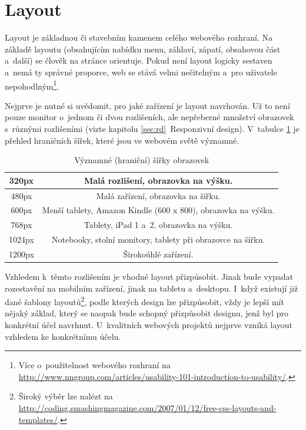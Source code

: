 \documentclass[thesis=B,czech]{FITthesis}[2012/06/26]
\begin{document}
\section{Layout}



Layout je základnou či stavebním kamenem celého webového rozhraní. Na základě layoutu (obsahujícím nabídku menu, záhlaví, zápatí, obsahovou část a~další) se člověk na stránce orientuje. Pokud není layout logicky sestaven a~nemá ty správné proporce, web se stává velmi nečitelným a~pro uživatele nepohodlným\footnote{Více o~použitelnost webového rozhraní na \url{http://www.nngroup.com/articles/usability-101-introduction-to-usability/}.}.

Nejprve je nutné si uvědomit, pro jaké zařízení je layout navrhován. Už to není pouze monitor o~jednom či dvou rozlišeních, ale nepřeberné množství obrazovek s~různými rozlišeními (vizte kapitolu \ref{sec:rd}~Responzivní design). V~tabulce \ref{tab:sirky} je přehled hraničních šířek, které jsou ve webovém světě významné.

\begin{table}\centering
 	\caption[Významné (hraniční) šířky]{Významné (hraniční) šířky obrazovek\cite{res}}\label{tab:sirky}%
 	\begin{tabular}{|c|c|}\hline
		320px & Malá rozlišení, obrazovka na výšku.\tabularnewline
		\hline 
		 480px & Malá zařízení, obrazovka na šířku.\tabularnewline
		\hline 
		600px & Menší tablety, Amazon Kindle (600 x 800), obrazovka na výšku.\tabularnewline
		\hline 
		768px & Tablety, iPad 1 a~2, obrazovka na výšku.\tabularnewline
		\hline 
		1024px & Notebooky, stolní monitory, tablety při obrazovce na šířku.\tabularnewline
		\hline 
		1200px & Širokoúhlé zařízení.\tabularnewline
		\hline 
 	\end{tabular}
\end{table}

Vzhledem k~těmto rozlišením je vhodné layout přizpůsobit. Jinak bude vypadat rozestavění na mobilním zařízení, jinak na tabletu a~desktopu. I~když existují již dané šablony layoutů\footnote{Široký výběr lze nalézt na \url{http://coding.smashingmagazine.com/2007/01/12/free-css-layouts-and-templates/}.}, podle kterých design lze přizpůsobit, vždy je lepší mít nějaký základ, který se naopak bude schopný přizpůsobit designu, jenž byl pro konkrétní účel navrhnut. U~kvalitních webových projektů nejprve vzniká layout vzhledem ke konkrétnímu účelu.
\end{document}
